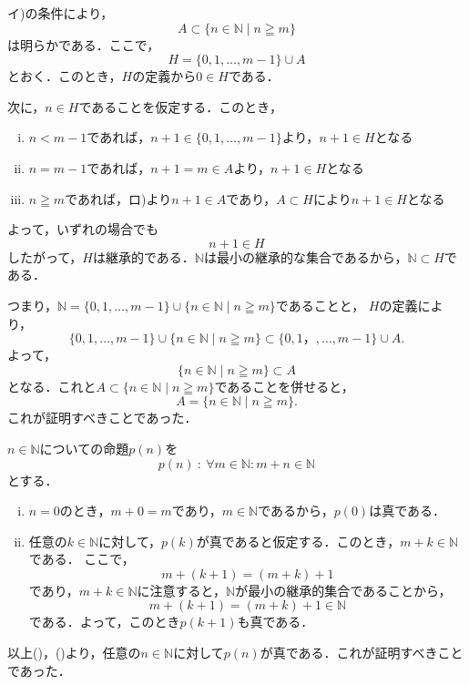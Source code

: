\begin{tproof}
    イ)の条件により，
    \[
        A \subset \{n \in \mathbb{N} \mid n \geqq m\}
    \]
    は明らかである．ここで，
    \[
        H=\{0,1,\dots,m-1\} \cup A
    \]
    とおく．このとき，$H$の定義から$0 \in H$である．

    次に，$n \in H$であることを仮定する．このとき，
    \begin{enumerate}[(i)]
        \item  $n<m-1$であれば，$n+1 \in \{0,1,\dots,m-1\}$より，$n+1 \in H$となる
        \item $n=m-1$であれば，$n+1=m \in A$より，$n+1 \in H$となる
        \item $n \geqq m$であれば，ロ)より$n+1 \in A$であり，$A \subset H $により$n + 1\in H$となる
    \end{enumerate}
    よって，いずれの場合でも
    \[
        n+1 \in H
    \]
    したがって，$H$は継承的である．$\mathbb{N}$は最小の継承的な集合であるから，$\mathbb{N} \subset H$である．

    つまり，$\mathbb{N} =  \{0,1,\dots,m-1\} \cup \{n \in \mathbb{N} \mid n \geqq m \}$であることと，
    $H$の定義により，
    \[
        \{0,1,\dots,m-1\} \cup \{n \in \mathbb{N} \mid n \geqq m \} \subset \{0,1，,\dots,m-1\} \cup A.
    \]
    よって，
    \[
        \{n \in \mathbb{N}\mid n \geqq m \} \subset A
    \]
    となる．これと$ A \subset \{n \in \mathbb{N} \mid n \geqq m\}$であることを併せると，
    \[
        A=\{n \in \mathbb{N} \mid n \geqq m \}.
    \]
    これが証明すべきことであった．
\end{tproof}





\begin{tproof}
    $n \in \mathbb{N}$についての命題$p(n)$を
    \[
        p(n) ~{:}~ \forall m \in \mathbb{N} \colon  m+n \in \mathbb{N}
    \]
    とする．
    \begin{enumerate}[(i)]
        \item $n=0$のとき，$m+0=m$であり，$m \in \mathbb{N}$であるから，$p(0)$は真である．
        \item 任意の$k \in \mathbb{N}$に対して，$p(k)$が真であると仮定する．このとき，$m+k \in \mathbb{N}$である．
              ここで，
              \[
                  m+(k+1)=(m+k)+1
              \] であり，$m+k \in \mathbb{N}$に注意すると，$\mathbb{N}$が最小の継承的集合であることから，
              \[
                  m+(k+1)=(m+k)+1  \in \mathbb{N}
              \]
              である．よって，このとき$p(k+1)$も真である．
    \end{enumerate}
    以上()，()より，任意の$n \in \mathbb{N}$に対して$p(n)$が真である．これが証明すべきことであった．
\end{tproof}


